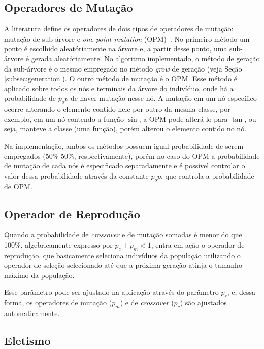 \documentclass[a4paper]{article}
\begin{document}
\subsection{Operadores de Mutação} \label{subsec:mutation}

A literatura define os operadores de dois tipos de operadores de mutação:
mutação de sub-árvore e \textit{one-point mutation} (OPM)~\citep{poli2008}. No
primeiro método um ponto é escolhido aleatóriamente na árvore e, a partir desse
ponto, uma sub-árvore é gerada aleatóriamente. No algoritmo implementado, o
método de geração da sub-árvore é o mesmo empregado no método \textit{grow} de
geração (veja Seção \ref{subsec:generation}). O outro método de mutação é o
OPM. Esse método é aplicado sobre todos os nós e terminais da árvore do
indivíduo, onde há a probabilidade de $p_op$ de haver mutação nesse nó. A
mutação em um nó específico ocorre alterando o elemento contido nele por outro
da mesma classe, por exemplo, em um nó contendo a função $\sin$, a OPM pode
alterá-lo para $\tan$, ou seja, manteve a classe (uma função), porém alterou o
elemento contido no nó.

Na implementação, ambos os métodos possuem igual probabilidade de serem
empregados (50\%-50\%, respectivamente), porém no caso do OPM a probabilidade de
mutação de cada nós é especificado separadamente e é possível controlar o valor
dessa probabilidade através da constante $p_op$, que controla a probabilidade de
OPM.

\subsection{Operador de Reprodução} \label{subsec:reproduction}

Quando a probabilidade de \textit{crossover} e de mutação somadas é menor do que
100\%, algebricamente expresso por $p_c + p_m < 1$, entra em ação o operador
de reprodução, que basicamente seleciona indivíduos da população utilizando
o operador de seleção selecionado até que a próxima geração atinja o tamanho
máximo da população.

Esse parâmetro pode ser ajustado na aplicação através do parâmetro $p_r$, e,
dessa forma, os operadores de mutação ($p_m$) e de \textit{crossover} ($p_c$)
são ajustados automaticamente.

\subsection{Eletismo}
\end{document}
